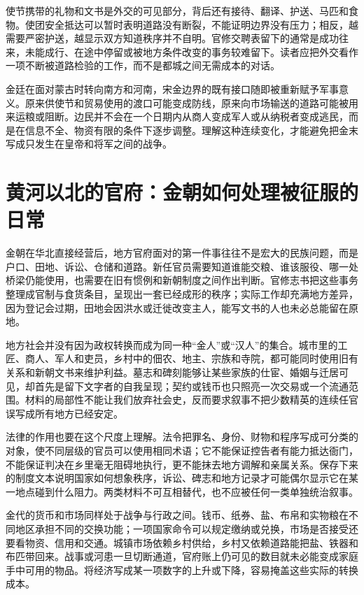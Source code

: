 使节携带的礼物和文书是外交的可见部分，背后还有接待、翻译、护送、马匹和食物。使团安全抵达可以暂时表明道路没有断裂，不能证明边界没有压力；相反，越需要严密护送，越显示双方知道秩序并不自明。官修交聘表留下的通常是成功往来，未能成行、在途中停留或被地方条件改变的事务较难留下。读者应把外交看作一项不断被道路检验的工作，而不是都城之间无需成本的对话。

金廷在面对蒙古时转向南方和河南，宋金边界的既有接口随即被重新赋予军事意义。原来供使节和贸易使用的渡口可能变成防线，原来向市场输送的道路可能被用来运粮或阻断。边民并不会在一个日期内从商人变成军人或从纳税者变成逃民，而是在信息不全、物资有限的条件下逐步调整。理解这种连续变化，才能避免把金末写成只发生在皇帝和将军之间的战争。

\section{黄河以北的官府：金朝如何处理被征服的日常}

金朝在华北直接经营后，地方官府面对的第一件事往往不是宏大的民族问题，而是户口、田地、诉讼、仓储和道路。新任官员需要知道谁能交粮、谁该服役、哪一处桥梁仍能使用，也需要在旧有惯例和新朝制度之间作出判断。官修志书把这些事务整理成官制与食货条目，呈现出一套已经成形的秩序；实际工作却充满地方差异，因为登记会过期，田地会因洪水或迁徙改变主人，能写文书的人也未必总能留在原地。

地方社会并没有因为政权转换而成为同一种“金人”或“汉人”的集合。城市里的工匠、商人、军人和吏员，乡村中的佃农、地主、宗族和寺院，都可能同时使用旧有关系和新朝文书来维护利益。墓志和碑刻能够让某些家族的仕宦、婚姻与迁居可见，却首先是留下文字者的自我呈现；契约或钱币也只照亮一次交易或一个流通范围。材料的局部性不能让我们放弃社会史，反而要求叙事不把少数精英的连续任官误写成所有地方已经安定。

法律的作用也要在这个尺度上理解。法令把罪名、身份、财物和程序写成可分类的对象，使不同层级的官员可以使用相同术语；它不能保证控告者有能力抵达衙门，不能保证判决在乡里毫无阻碍地执行，更不能抹去地方调解和亲属关系。保存下来的制度文本说明国家如何想象秩序，诉讼、碑志和地方记录才可能偶尔显示它在某一地点碰到什么阻力。两类材料不可互相替代，也不应被任何一类单独统治叙事。

金代的货币和市场同样处于战争与行政之间。钱币、纸券、盐、布帛和实物粮在不同地区承担不同的交换功能；一项国家命令可以规定缴纳或兑换，市场是否接受还要看物资、信用和交通。城镇市场依赖乡村供给，乡村又依赖道路能把盐、铁器和布匹带回来。战事或河患一旦切断通道，官府账上仍可见的数目就未必能变成家庭手中可用的物品。将经济写成某一项数字的上升或下降，容易掩盖这些实际的转换成本。


